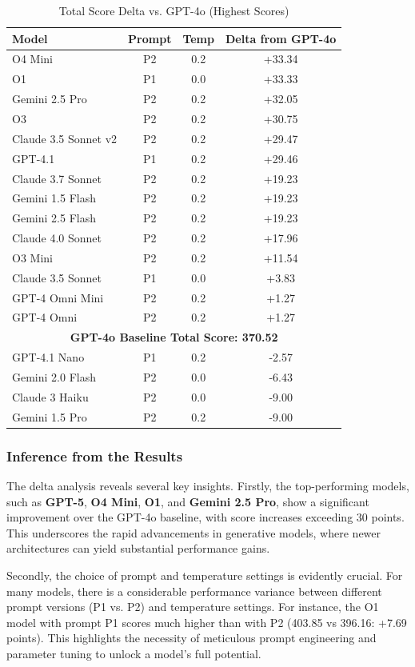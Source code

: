 \begin{table}[!htbp]
\centering
\small
\caption{Total Score Delta vs. GPT-4o (Highest Scores)}
\label{tab:deepeval_delta_results}
\begin{tabular}{|l|c|c|c|}
\hline
\textbf{Model} & \textbf{Prompt} & \textbf{Temp} & \textbf{Delta from GPT-4o} \\
\hline
O4 Mini & P2 & 0.2 & +33.34 \\
O1 & P1 & 0.0 & +33.33 \\
Gemini 2.5 Pro & P2 & 0.2 & +32.05 \\
O3 & P2 & 0.2 & +30.75 \\
Claude 3.5 Sonnet v2 & P2 & 0.2 & +29.47 \\
GPT-4.1 & P1 & 0.2 & +29.46 \\
Claude 3.7 Sonnet & P2 & 0.2 & +19.23 \\
Gemini 1.5 Flash & P2 & 0.2 & +19.23 \\
Gemini 2.5 Flash & P2 & 0.2 & +19.23 \\
Claude 4.0 Sonnet & P2 & 0.2 & +17.96 \\
O3 Mini & P2 & 0.2 & +11.54 \\
Claude 3.5 Sonnet & P1 & 0.0 & +3.83 \\
GPT-4 Omni Mini & P2 & 0.2 & +1.27 \\
GPT-4 Omni & P2 & 0.2 & +1.27 \\
\hline
\multicolumn{4}{|c|}{\textbf{GPT-4o Baseline Total Score: 370.52}} \\
\hline
GPT-4.1 Nano & P1 & 0.2 & -2.57 \\
Gemini 2.0 Flash & P2 & 0.0 & -6.43 \\
Claude 3 Haiku & P2 & 0.0 & -9.00 \\
Gemini 1.5 Pro & P2 & 0.2 & -9.00 \\
\hline
\end{tabular}
\end{table}

\subsubsection{Inference from the Results}
The delta analysis reveals several key insights. Firstly, the top-performing models, such as \textbf{GPT-5}, \textbf{O4 Mini}, \textbf{O1}, and \textbf{Gemini 2.5 Pro}, show a significant improvement over the GPT-4o baseline, with score increases exceeding 30 points. This underscores the rapid advancements in generative models, where newer architectures can yield substantial performance gains.

Secondly, the choice of prompt and temperature settings is evidently crucial. For many models, there is a considerable performance variance between different prompt versions (P1 vs. P2) and temperature settings. For instance, the O1 model with prompt P1 scores much higher than with P2 (403.85 vs 396.16: +7.69 points). This highlights the necessity of meticulous prompt engineering and parameter tuning to unlock a model's full potential.
